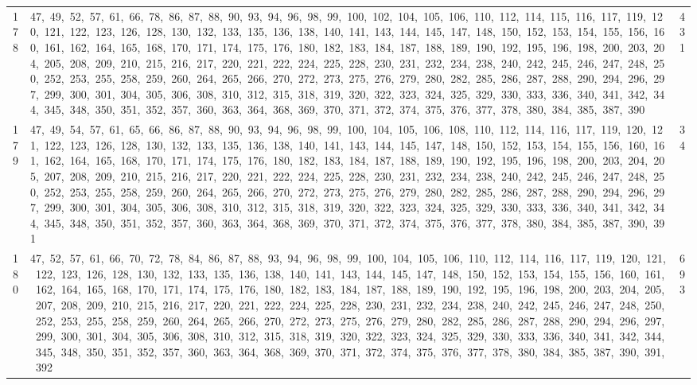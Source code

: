 \begin{longtable}{c|p{}|r}
178 & 47,\ 49,\ 52,\ 57,\ 61,\ 66,\ 78,\ 86,\ 87,\ 88,\ 90,\ 93,\ 94,\ 96,\ 98,\ 99,\ 100,\ 102,\ 104,\ 105,\ 106,\ 110,\ 112,\ 114,\ 115,\ 116,\ 117,\ 119,\ 120,\ 121,\ 122,\ 123,\ 126,\ 128,\ 130,\ 132,\ 133,\ 135,\ 136,\ 138,\ 140,\ 141,\ 143,\ 144,\ 145,\ 147,\ 148,\ 150,\ 152,\ 153,\ 154,\ 155,\ 156,\ 160,\ 161,\ 162,\ 164,\ 165,\ 168,\ 170,\ 171,\ 174,\ 175,\ 176,\ 180,\ 182,\ 183,\ 184,\ 187,\ 188,\ 189,\ 190,\ 192,\ 195,\ 196,\ 198,\ 200,\ 203,\ 204,\ 205,\ 208,\ 209,\ 210,\ 215,\ 216,\ 217,\ 220,\ 221,\ 222,\ 224,\ 225,\ 228,\ 230,\ 231,\ 232,\ 234,\ 238,\ 240,\ 242,\ 245,\ 246,\ 247,\ 248,\ 250,\ 252,\ 253,\ 255,\ 258,\ 259,\ 260,\ 264,\ 265,\ 266,\ 270,\ 272,\ 273,\ 275,\ 276,\ 279,\ 280,\ 282,\ 285,\ 286,\ 287,\ 288,\ 290,\ 294,\ 296,\ 297,\ 299,\ 300,\ 301,\ 304,\ 305,\ 306,\ 308,\ 310,\ 312,\ 315,\ 318,\ 319,\ 320,\ 322,\ 323,\ 324,\ 325,\ 329,\ 330,\ 333,\ 336,\ 340,\ 341,\ 342,\ 344,\ 345,\ 348,\ 350,\ 351,\ 352,\ 357,\ 360,\ 363,\ 364,\ 368,\ 369,\ 370,\ 371,\ 372,\ 374,\ 375,\ 376,\ 377,\ 378,\ 380,\ 384,\ 385,\ 387,\ 390 & 431 \\
179 & 47,\ 49,\ 54,\ 57,\ 61,\ 65,\ 66,\ 86,\ 87,\ 88,\ 90,\ 93,\ 94,\ 96,\ 98,\ 99,\ 100,\ 104,\ 105,\ 106,\ 108,\ 110,\ 112,\ 114,\ 116,\ 117,\ 119,\ 120,\ 121,\ 122,\ 123,\ 126,\ 128,\ 130,\ 132,\ 133,\ 135,\ 136,\ 138,\ 140,\ 141,\ 143,\ 144,\ 145,\ 147,\ 148,\ 150,\ 152,\ 153,\ 154,\ 155,\ 156,\ 160,\ 161,\ 162,\ 164,\ 165,\ 168,\ 170,\ 171,\ 174,\ 175,\ 176,\ 180,\ 182,\ 183,\ 184,\ 187,\ 188,\ 189,\ 190,\ 192,\ 195,\ 196,\ 198,\ 200,\ 203,\ 204,\ 205,\ 207,\ 208,\ 209,\ 210,\ 215,\ 216,\ 217,\ 220,\ 221,\ 222,\ 224,\ 225,\ 228,\ 230,\ 231,\ 232,\ 234,\ 238,\ 240,\ 242,\ 245,\ 246,\ 247,\ 248,\ 250,\ 252,\ 253,\ 255,\ 258,\ 259,\ 260,\ 264,\ 265,\ 266,\ 270,\ 272,\ 273,\ 275,\ 276,\ 279,\ 280,\ 282,\ 285,\ 286,\ 287,\ 288,\ 290,\ 294,\ 296,\ 297,\ 299,\ 300,\ 301,\ 304,\ 305,\ 306,\ 308,\ 310,\ 312,\ 315,\ 318,\ 319,\ 320,\ 322,\ 323,\ 324,\ 325,\ 329,\ 330,\ 333,\ 336,\ 340,\ 341,\ 342,\ 344,\ 345,\ 348,\ 350,\ 351,\ 352,\ 357,\ 360,\ 363,\ 364,\ 368,\ 369,\ 370,\ 371,\ 372,\ 374,\ 375,\ 376,\ 377,\ 378,\ 380,\ 384,\ 385,\ 387,\ 390,\ 391 & 34 \\
180 & 47,\ 52,\ 57,\ 61,\ 66,\ 70,\ 72,\ 78,\ 84,\ 86,\ 87,\ 88,\ 93,\ 94,\ 96,\ 98,\ 99,\ 100,\ 104,\ 105,\ 106,\ 110,\ 112,\ 114,\ 116,\ 117,\ 119,\ 120,\ 121,\ 122,\ 123,\ 126,\ 128,\ 130,\ 132,\ 133,\ 135,\ 136,\ 138,\ 140,\ 141,\ 143,\ 144,\ 145,\ 147,\ 148,\ 150,\ 152,\ 153,\ 154,\ 155,\ 156,\ 160,\ 161,\ 162,\ 164,\ 165,\ 168,\ 170,\ 171,\ 174,\ 175,\ 176,\ 180,\ 182,\ 183,\ 184,\ 187,\ 188,\ 189,\ 190,\ 192,\ 195,\ 196,\ 198,\ 200,\ 203,\ 204,\ 205,\ 207,\ 208,\ 209,\ 210,\ 215,\ 216,\ 217,\ 220,\ 221,\ 222,\ 224,\ 225,\ 228,\ 230,\ 231,\ 232,\ 234,\ 238,\ 240,\ 242,\ 245,\ 246,\ 247,\ 248,\ 250,\ 252,\ 253,\ 255,\ 258,\ 259,\ 260,\ 264,\ 265,\ 266,\ 270,\ 272,\ 273,\ 275,\ 276,\ 279,\ 280,\ 282,\ 285,\ 286,\ 287,\ 288,\ 290,\ 294,\ 296,\ 297,\ 299,\ 300,\ 301,\ 304,\ 305,\ 306,\ 308,\ 310,\ 312,\ 315,\ 318,\ 319,\ 320,\ 322,\ 323,\ 324,\ 325,\ 329,\ 330,\ 333,\ 336,\ 340,\ 341,\ 342,\ 344,\ 345,\ 348,\ 350,\ 351,\ 352,\ 357,\ 360,\ 363,\ 364,\ 368,\ 369,\ 370,\ 371,\ 372,\ 374,\ 375,\ 376,\ 377,\ 378,\ 380,\ 384,\ 385,\ 387,\ 390,\ 391,\ 392 & 693 \\

\end{longtable}
